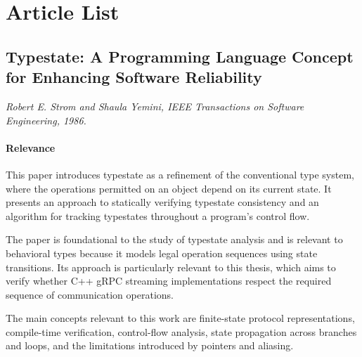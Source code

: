 
\section{Article List}

\subsection{Typestate: A Programming Language Concept for Enhancing Software Reliability}
\textit{Robert E. Strom and Shaula Yemini, IEEE Transactions on Software Engineering, 1986.}

\paragraph{Relevance}
This paper introduces typestate as a refinement of the conventional type
system, where the operations permitted on an object depend on its current
state. It presents an approach to statically verifying typestate consistency
and an algorithm for tracking typestates throughout a program's control flow.

The paper is foundational to the study of typestate analysis and is relevant
to behavioral types because it models legal operation sequences using
state transitions. Its approach is particularly relevant to this thesis,
which aims to verify whether C++ gRPC streaming implementations respect
the required sequence of communication operations.

The main concepts relevant to this work are finite-state protocol
representations, compile-time verification, control-flow analysis, state
propagation across branches and loops, and the limitations introduced by
pointers and aliasing.

